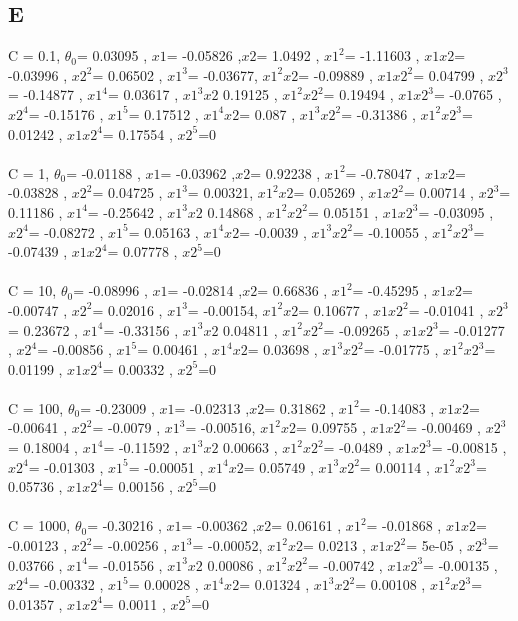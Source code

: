 \documentclass[11pt]{article} %
\begin{document}
 \subsection{E}
C = 0.1, \(\theta_0\)= 0.03095 , \(x1\)= -0.05826 ,\(x2\)= 1.0492 , \(x1^2\)= -1.11603 , \(x1 x2\)= -0.03996 , \(x2^2\)= 0.06502 , \(x1^3\)= -0.03677, \(x1^2 x2\)= -0.09889 , \(x1 x2^2\)= 0.04799 , \(x2^3\)= -0.14877 , \(x1^4\)= 0.03617 , \(x1^3 x2\) 0.19125 , \(x1^2 x2^2\)= 0.19494 , \(x1 x2^3\)= -0.0765 , \(x2^4\)= -0.15176 , \(x1^5\)= 0.17512 , \(x1^4 x2\)= 0.087 , \(x1^3 x2^2\)= -0.31386 , \(x1^2 x2^3\)= 0.01242 , \(x1 x2^4\)= 0.17554 , \(x2^5\)=0 \\\\
 C = 1, \(\theta_0\)= -0.01188 , \(x1\)= -0.03962 ,\(x2\)= 0.92238 , \(x1^2\)= -0.78047 , \(x1 x2\)= -0.03828 , \(x2^2\)= 0.04725 , \(x1^3\)= 0.00321, \(x1^2 x2\)= 0.05269 , \(x1 x2^2\)= 0.00714 , \(x2^3\)= 0.11186 , \(x1^4\)= -0.25642 , \(x1^3 x2\) 0.14868 , \(x1^2 x2^2\)= 0.05151 , \(x1 x2^3\)= -0.03095 , \(x2^4\)= -0.08272 , \(x1^5\)= 0.05163 , \(x1^4 x2\)= -0.0039 , \(x1^3 x2^2\)= -0.10055 , \(x1^2 x2^3\)= -0.07439 , \(x1 x2^4\)= 0.07778 , \(x2^5\)=0 \\\\
 C = 10, \(\theta_0\)= -0.08996 , \(x1\)= -0.02814 ,\(x2\)= 0.66836 , \(x1^2\)= -0.45295 , \(x1 x2\)= -0.00747 , \(x2^2\)= 0.02016 , \(x1^3\)= -0.00154, \(x1^2 x2\)= 0.10677 , \(x1 x2^2\)= -0.01041 , \(x2^3\)= 0.23672 , \(x1^4\)= -0.33156 , \(x1^3 x2\) 0.04811 , \(x1^2 x2^2\)= -0.09265 , \(x1 x2^3\)= -0.01277 , \(x2^4\)= -0.00856 , \(x1^5\)= 0.00461 , \(x1^4 x2\)= 0.03698 , \(x1^3 x2^2\)= -0.01775 , \(x1^2 x2^3\)= 0.01199 , \(x1 x2^4\)= 0.00332 , \(x2^5\)=0 \\\\
 C = 100, \(\theta_0\)= -0.23009 , \(x1\)= -0.02313 ,\(x2\)= 0.31862 , \(x1^2\)= -0.14083 , \(x1 x2\)= -0.00641 , \(x2^2\)= -0.0079 , \(x1^3\)= -0.00516, \(x1^2 x2\)= 0.09755 , \(x1 x2^2\)= -0.00469 , \(x2^3\)= 0.18004 , \(x1^4\)= -0.11592 , \(x1^3 x2\) 0.00663 , \(x1^2 x2^2\)= -0.0489 , \(x1 x2^3\)= -0.00815 , \(x2^4\)= -0.01303 , \(x1^5\)= -0.00051 , \(x1^4 x2\)= 0.05749 , \(x1^3 x2^2\)= 0.00114 , \(x1^2 x2^3\)= 0.05736 , \(x1 x2^4\)= 0.00156 , \(x2^5\)=0 \\\\
 C = 1000, \(\theta_0\)= -0.30216 , \(x1\)= -0.00362 ,\(x2\)= 0.06161 , \(x1^2\)= -0.01868 , \(x1 x2\)= -0.00123 , \(x2^2\)= -0.00256 , \(x1^3\)= -0.00052, \(x1^2 x2\)= 0.0213 , \(x1 x2^2\)= 5e-05 , \(x2^3\)= 0.03766 , \(x1^4\)= -0.01556 , \(x1^3 x2\) 0.00086 , \(x1^2 x2^2\)= -0.00742 , \(x1 x2^3\)= -0.00135 , \(x2^4\)= -0.00332 , \(x1^5\)= 0.00028 , \(x1^4 x2\)= 0.01324 , \(x1^3 x2^2\)= 0.00108 , \(x1^2 x2^3\)= 0.01357 , \(x1 x2^4\)= 0.0011 , \(x2^5\)=0 \\\\
\end{document}
